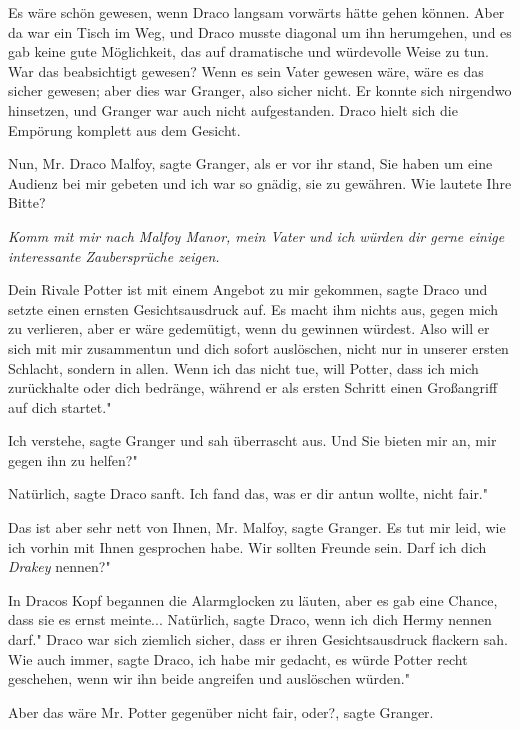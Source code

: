 Es wäre schön gewesen, wenn Draco langsam vorwärts hätte gehen können. Aber da
war ein Tisch im Weg, und Draco musste diagonal um ihn herumgehen, und es gab
keine gute Möglichkeit, das auf dramatische und würdevolle Weise zu tun. War das
beabsichtigt gewesen? Wenn es sein Vater gewesen wäre, wäre es das sicher
gewesen; aber dies war Granger, also sicher nicht. Er konnte sich nirgendwo
hinsetzen, und Granger war auch nicht aufgestanden. Draco hielt sich die
Empörung komplett aus dem Gesicht.

\glqq Nun, Mr. Draco Malfoy\grqq{}, sagte Granger, als er vor ihr stand, \glqq
Sie haben um eine Audienz bei mir gebeten und ich war so gnädig, sie zu
gewähren. Wie lautete Ihre Bitte?\grqq{}

\emph{Komm mit mir nach Malfoy Manor, mein Vater und ich würden dir gerne einige interessante Zaubersprüche zeigen.}

\glqq Dein Rivale Potter ist mit einem Angebot zu mir gekommen\grqq{}, sagte
Draco und setzte einen ernsten Gesichtsausdruck auf. \glqq Es macht ihm nichts
aus, gegen mich zu verlieren, aber er wäre gedemütigt, wenn du gewinnen würdest.
Also will er sich mit mir zusammentun und dich sofort auslöschen, nicht nur in
unserer ersten Schlacht, sondern in allen. Wenn ich das nicht tue, will Potter,
dass ich mich zurückhalte oder dich bedränge, während er als ersten Schritt
einen Großangriff auf dich startet."

\glqq Ich verstehe\grqq{}, sagte Granger und sah überrascht aus. \glqq Und Sie
bieten mir an, mir gegen ihn zu helfen?"

\glqq Natürlich\grqq{}, sagte Draco sanft. \glqq Ich fand das, was er dir antun
wollte, nicht fair."

\glqq Das ist aber sehr nett von Ihnen, Mr. Malfoy\grqq{}, sagte Granger. \glqq
Es tut mir leid, wie ich vorhin mit Ihnen gesprochen habe. Wir sollten Freunde
sein. Darf ich dich \emph{Drakey} nennen?"

In Dracos Kopf begannen die Alarmglocken zu läuten, aber es gab eine Chance,
dass sie es ernst meinte... \glqq Natürlich\grqq{}, sagte Draco, \glqq wenn ich
dich Hermy nennen darf." Draco war sich ziemlich sicher, dass er ihren
Gesichtsausdruck flackern sah. \glqq Wie auch immer\grqq{}, sagte Draco, \glqq
ich habe mir gedacht, es würde Potter recht geschehen, wenn wir ihn beide
angreifen und auslöschen würden."

\glqq Aber das wäre Mr. Potter gegenüber nicht fair, oder?\grqq{}, sagte
Granger.

